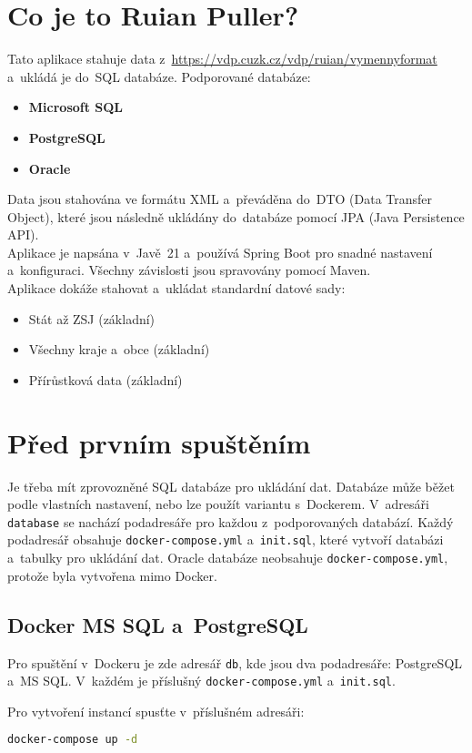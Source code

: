 \section*{Co je to Ruian Puller?}
Tato aplikace stahuje data z~\url{https://vdp.cuzk.cz/vdp/ruian/vymennyformat} a~ukládá je do~SQL databáze.  
Podporované databáze:  
\begin{itemize}
  \item \textbf{Microsoft SQL}
  \item \textbf{PostgreSQL}
  \item \textbf{Oracle}
\end{itemize}

Data jsou stahována ve formátu XML a~převáděna do~DTO (Data Transfer Object), které jsou následně ukládány do~databáze pomocí JPA (Java Persistence API).\\
Aplikace je napsána v~Javě~21 a~používá Spring Boot pro snadné nastavení a~konfiguraci. Všechny závislosti jsou spravovány pomocí Maven.\\
Aplikace dokáže stahovat a~ukládat standardní datové sady:
\begin{itemize}
  \item Stát až ZSJ (základní)
  \item Všechny kraje a~obce (základní)
  \item Přírůstková data (základní)
\end{itemize}

\section*{Před prvním spuštěním}
Je třeba mít zprovozněné SQL databáze pro ukládání dat. Databáze může běžet podle vlastních nastavení, nebo lze použít variantu s~Dockerem.
V~adresáři \texttt{database} se nachází podadresáře pro každou z~podporovaných databází. Každý podadresář obsahuje \texttt{docker-compose.yml} a~\texttt{init.sql}, 
které vytvoří databázi a~tabulky pro ukládání dat.
Oracle databáze neobsahuje \texttt{docker-compose.yml}, protože byla vytvořena mimo Docker.

\subsection*{Docker MS SQL a~PostgreSQL}
Pro spuštění v~Dockeru je zde adresář \texttt{db}, kde jsou dva podadresáře: PostgreSQL a~MS SQL. V~každém je příslušný \texttt{docker-compose.yml} a~\texttt{init.sql}.

Pro vytvoření instancí spusťte v~příslušném adresáři:
\begin{lstlisting}[language=bash]
docker-compose up -d
\end{lstlisting}

